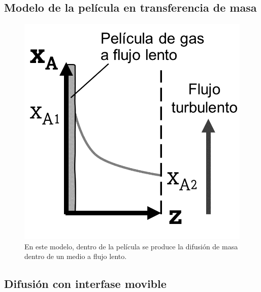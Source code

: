 \subsection{Modelo de la película en transferencia de masa}

\begin{figure}[H]
	\centering
	\includegraphics[scale=0.2]{./Capitulo2/Imagenes/fig-2-2.PNG}
	\caption{En este modelo, dentro de la película 		se produce la difusión de masa dentro de un 			medio a flujo lento.}
\end{figure}

\subsection{Difusión con interfase movible}

